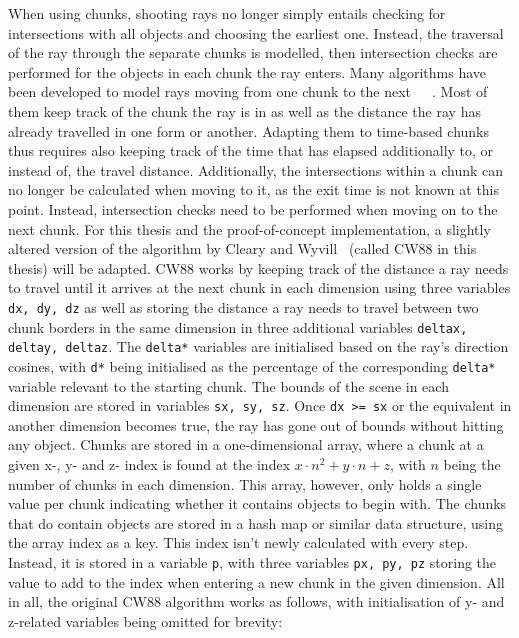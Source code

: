 When using chunks, shooting rays no longer simply entails checking for intersections with all objects and choosing the earliest one.
Instead, the traversal of the ray through the separate chunks is modelled,
then intersection checks are performed for the objects in each chunk the ray enters.
\newline
Many algorithms have been developed to model rays moving from one chunk to the next~\cite{CW88}~\cite{FI85}~\cite{HT92}.
Most of them keep track of the chunk the ray is in as well as the distance the ray has already travelled in one form or another.
Adapting them to time-based chunks thus requires also keeping track of the time that has elapsed additionally to,
or instead of, the travel distance.
Additionally, the intersections within a chunk can no longer be calculated when moving to it,
as the exit time is not known at this point.
Instead, intersection checks need to be performed when moving on to the next chunk.
\newline
For this thesis and the proof-of-concept implementation,
a slightly altered version of the algorithm by Cleary and Wyvill~\cite{CW88} (called CW88 in this thesis) will be adapted.
\newline
CW88 works by keeping track of the distance a ray needs to travel until it arrives at the next chunk in each dimension
using three variables \verb|dx, dy, dz|
as well as storing the distance a ray needs to travel between two chunk borders in the same dimension
in three additional variables \verb|deltax, deltay, deltaz|.
The \verb|delta*| variables are initialised based on the ray's direction cosines,
with \verb|d*| being initialised as the percentage of the corresponding \verb|delta*| variable relevant to the starting chunk.
The bounds of the scene in each dimension are stored in variables \verb|sx, sy, sz|.
Once \verb|dx >= sx| or the equivalent in another dimension becomes true,
the ray has gone out of bounds without hitting any object.
\newline
Chunks are stored in a one-dimensional array,
where a chunk at a given x-, y- and z- index is found at the index \(x \cdot n^2 + y \cdot n + z\),
with \(n\) being the number of chunks in each dimension.
This array, however, only holds a single value per chunk indicating whether it contains objects to begin with.
The chunks that do contain objects are stored in a hash map or similar data structure,
using the array index as a key.
\newline
This index isn't newly calculated with every step.
Instead, it is stored in a variable \verb|p|,
with three variables \verb|px, py, pz| storing the value to add to the index when entering a new chunk in the given dimension.
\newline
All in all, the original CW88 algorithm works as follows,
with initialisation of y- and z-related variables being omitted for brevity:

